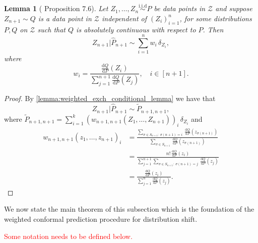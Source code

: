 \documentclass[11pt, titlepage]{article} %
\newcommand{\R}{\mathrm}
\numberwithin{equation}{section}
\newtheorem{lemma}{Lemma}
\theoremstyle{definition}
\numberwithin{theorem}{section}
\numberwithin{lemma}{section}
\numberwithin{corollary}{section}
\numberwithin{proposition}{section}
\numberwithin{definition}{section}
\numberwithin{remark}{section}
\begin{document}
\begin{lemma}[\cite{angelopoulos2024theoreticalfoundationsconformalprediction} Proposition 7.6]
    Let \(Z_1, \ldots, Z_n \overset{\R{i.i.d}}{\sim} P \) be data points in \(\mathcal{Z}\) and suppose \(Z_{n+1} \sim Q\) is a data point in \(\mathcal{Z}\) independent of \((Z_i)_{i=1}^n\), for some distributions \(P, Q\) on \(\mathcal{Z}\) such that \(Q\) is absolutely continuous with respect to \(P\). Then \[Z_{n+1} | \hat{P}_{n+1} \sim \sum_{i=1}^{n} w_i \, \delta_{Z_i},\] where \begin{equation}
        w_i = \frac{ \frac{\R{d}Q}{\R{d}P}(Z_i)  }{ \sum_{j=1}^{n+1}  \frac{\R{d}Q}{\R{d}P}(Z_j) }, \quad i \in [n+1].
    \label{eqn:dist_shift_weights}
    \end{equation}
\label{lemma:dist_shift_empirical_dist}
\end{lemma}
\begin{proof}
    By \cref{lemma:weighted_exch_conditional_lemma} we have that \[Z_{n+1} | \hat{P}_{n+1} \sim \tilde{P}_{n+1, n+1},\] where \(\tilde{P}_{n+1, n+1} = \sum_{i=1}^{k} \left(w_{n+1, n+1}(Z_1, \ldots, Z_{n+1})\right)_i \, \delta_{Z_i}\) and \begin{align*}
        w_{n+1, n+1}(z_1, \ldots, z_{n+1})_i &= 
        \frac{\sum_{\sigma \in S_{n+1}: \ \sigma(n+1) = i} \ \frac{\R{d}Q}{\R{d}P}(z_{\sigma(n+1)}) }{\sum_{\sigma \in S_{n+1}} \, \frac{\R{d}Q}{\R{d}P}(z_{\sigma(n+1)}) } \\
        &= \frac{n! \, \frac{\R{d}Q}{\R{d}P}(z_i)}{\sum_{j=1}^{n+1} \sum_{\sigma \in S_{n+1}: \ \sigma(n+1)=j} \ \frac{\R{d}Q}{\R{d}P}(z_j) } \\
        &= \frac{\frac{\R{d}Q}{\R{d}P}(z_i)}{\sum_{j=1}^{n} \frac{\R{d}Q}{\R{d}P}(z_j)}.
    \end{align*}
\end{proof}

\noindent
We now state the main theorem of this subsection which is the foundation of the weighted conformal prediction procedure for distribution shift.

\textcolor{red}{Some notation needs to be defined below.}
\end{document}
